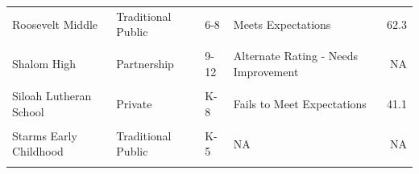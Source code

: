 \documentclass[
]{article}
\begin{document}
\begin{longtable}[t]{>{\raggedright\arraybackslash}p{10em}ll>{\raggedright\arraybackslash}p{10em}r}
Roosevelt Middle & Traditional Public & 6-8 & Meets Expectations & 62.3\\
\cellcolor{gray!6}{Saint Marcus Lutheran School} & \cellcolor{gray!6}{Private} & \cellcolor{gray!6}{K-8} & \cellcolor{gray!6}{Significantly Exceeds Expectations} & \cellcolor{gray!6}{91.6}\\
Shalom High & Partnership & 9-12 & Alternate Rating - Needs Improvement & NA\\
\addlinespace
\cellcolor{gray!6}{Siefert Elementary} & \cellcolor{gray!6}{Traditional Public} & \cellcolor{gray!6}{K-5} & \cellcolor{gray!6}{Meets Expectations} & \cellcolor{gray!6}{62.4}\\
Siloah Lutheran School & Private & K-8 & Fails to Meet Expectations & 41.1\\
\cellcolor{gray!6}{Starms Discovery} & \cellcolor{gray!6}{Traditional Public} & \cellcolor{gray!6}{K-8} & \cellcolor{gray!6}{Meets Expectations} & \cellcolor{gray!6}{66.6}\\
Starms Early Childhood & Traditional Public & K-5 & NA & NA\\
\cellcolor{gray!6}{Wisconsin Conservatory of Lifelong Learning} & \cellcolor{gray!6}{Traditional Public} & \cellcolor{gray!6}{K-12} & \cellcolor{gray!6}{Fails to Meet Expectations} & \cellcolor{gray!6}{39.5}\\
\bottomrule
\end{longtable}
\endgroup{}
\end{document}
